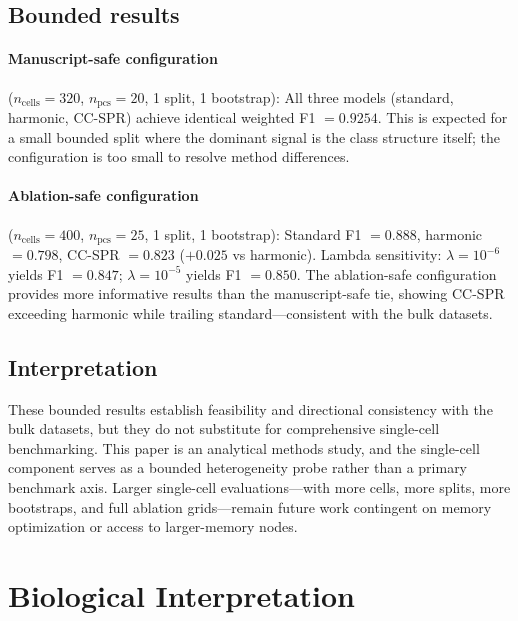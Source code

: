\documentclass[11pt]{article}
\begin{document}
\subsection{Bounded results}

\paragraph{Manuscript-safe configuration} ($n_{\text{cells}} = 320$, $n_{\text{pcs}} = 20$, 1 split, 1 bootstrap):
All three models (standard, harmonic, CC-SPR) achieve identical weighted F1 $= 0.9254$.
This is expected for a small bounded split where the dominant signal is the class structure itself; the configuration is too small to resolve method differences.

\paragraph{Ablation-safe configuration} ($n_{\text{cells}} = 400$, $n_{\text{pcs}} = 25$, 1 split, 1 bootstrap):
Standard F1 $= 0.888$, harmonic $= 0.798$, CC-SPR $= 0.823$ ($+0.025$ vs harmonic).
Lambda sensitivity: $\lambda = 10^{-6}$ yields F1 $= 0.847$; $\lambda = 10^{-5}$ yields F1 $= 0.850$.
The ablation-safe configuration provides more informative results than the manuscript-safe tie, showing CC-SPR exceeding harmonic while trailing standard---consistent with the bulk datasets.

\subsection{Interpretation}

These bounded results establish feasibility and directional consistency with the bulk datasets, but they do not substitute for comprehensive single-cell benchmarking.
This paper is an analytical methods study, and the single-cell component serves as a bounded heterogeneity probe rather than a primary benchmark axis.
Larger single-cell evaluations---with more cells, more splits, more bootstraps, and full ablation grids---remain future work contingent on memory optimization or access to larger-memory nodes.

\section{Biological Interpretation}
\label{sec:biology}
\end{document}
